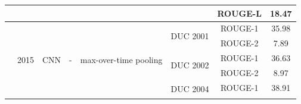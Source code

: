 \documentclass[12pt, a4paper, oneside]{report}
\begin{document}
\begin{tiny}
\begin{latin}
\begin{longtable}{|c|c|c|c|c|c|cc|}
                                                                              &                       &                                   &                                         &                                                                                                        &                                       & \multicolumn{1}{c|}{ROUGE-L}                                                                                                       & 18.47  \\ \hline
        \multirow{6}{*}{\cite{ziqiang2015prior}}             & \multirow{6}{*}{2015} & \multirow{6}{*}{CNN}              & \multirow{6}{*}{-}                      & \multirow{6}{*}{max-over-time pooling}                                                                 & \multirow{2}{*}{DUC 2001}             & \multicolumn{1}{c|}{ROUGE-1}                                                                                                       & 35.98  \\ \cline{7-8} 
                                                                              &                       &                                   &                                         &                                                                                                        &                                       & \multicolumn{1}{c|}{ROUGE-2}                                                                                                       & 7.89   \\ \cline{6-8} 
                                                                              &                       &                                   &                                         &                                                                                                        & \multirow{2}{*}{DUC 2002}             & \multicolumn{1}{c|}{ROUGE-1}                                                                                                       & 36.63  \\ \cline{7-8} 
                                                                              &                       &                                   &                                         &                                                                                                        &                                       & \multicolumn{1}{c|}{ROUGE-2}                                                                                                       & 8.97   \\ \cline{6-8} 
                                                                              &                       &                                   &                                         &                                                                                                        & \multirow{2}{*}{DUC 2004}             & \multicolumn{1}{c|}{ROUGE-1}                                                                                                       & 38.91  \\ \cline{7-8} 

\end{longtable}
\end{latin}
\end{tiny}
\end{document}
